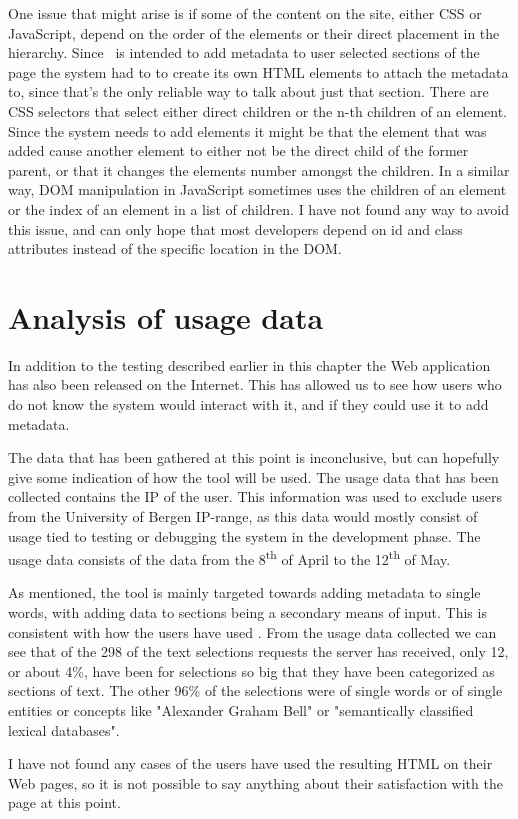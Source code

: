 One issue that might arise is if some of the content on the site, either CSS or JavaScript,
depend on the order of the elements or their direct placement in the hierarchy.
Since \theartefact\ is intended to add metadata to user selected sections of the page the system had to  to create its own
HTML elements to attach the metadata to, since that's the only reliable way to talk about just that section.
There are CSS selectors that select either direct children or the n-th children of an element.
Since the system needs to add elements it might be that the element that was added cause another element to either not be the direct
child of the former parent, or that it changes the elements number amongst the children.
In a similar way, DOM manipulation in JavaScript sometimes uses the children of an element or the index of an element
in a list of children.
I have not found any way to avoid this issue,
and can only hope that most developers depend on id and class attributes instead of the specific location in the DOM.

\section{Analysis of usage data}
In addition to the testing described earlier in this chapter the Web application  has also been released on the Internet.
This has allowed us to see how users who do not know the system would interact with it,
and if they could use it to add metadata.

The data that has been gathered at this point is inconclusive, but can hopefully give some indication of how the tool will be used.
The usage data that has been collected contains the IP of the user.
This information was used to exclude users from the University of Bergen IP-range,
as this data would mostly consist of usage tied to testing or debugging the system in the development phase.
The usage data consists of the data from the 8\textsuperscript{th}	 of April to the 12\textsuperscript{th} of May.

As mentioned, the tool is mainly targeted towards adding metadata to single words, with adding data to sections being
a secondary means of input.
This is consistent with how the users have used \theartefact.
From the usage data collected we can see that of the 298 of the text selections requests the server has received,
only 12, or about 4\%, have been for selections so big that they have been categorized as sections of text.
The other 96\% of the selections were of single words or of single entities or concepts like "Alexander Graham Bell" or
"semantically classified lexical databases".

I have not found any cases of the users have used the resulting HTML on their Web pages,
so it is not possible to say anything about their satisfaction with the page at this point.
